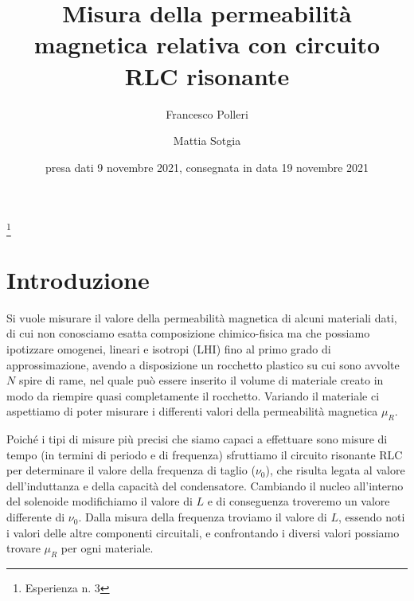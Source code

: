 \documentclass[
    rmp,
    floatfix,
    reprint, 
    superscriptaddress, 
    altaffilletter, 
    amsmath, 
    amssymb, 
    a4paper]{revtex4-2}
\begin{document}
\title{Misura della permeabilità magnetica relativa con circuito RLC risonante
}
\thanks{Esperienza n. 3
}

\author{Francesco Polleri}
\author{Mattia Sotgia}


\date{presa dati
    9 novembre 2021, consegnata in data
    19 novembre 2021
}

\begin{abstract}
    
\end{abstract}
\maketitle
\thispagestyle{fancy}


\section*{Introduzione}\label{sec:introduction}
Si vuole misurare il valore della permeabilità magnetica di alcuni materiali dati, di cui non conosciamo esatta composizione chimico-fisica ma che possiamo ipotizzare omogenei, lineari e isotropi (LHI) fino al primo grado di approssimazione, avendo a disposizione un rocchetto plastico su cui sono avvolte $N$ spire di rame, nel quale può essere inserito il volume di materiale creato in modo da riempire quasi completamente il rocchetto. Variando il materiale ci aspettiamo di poter misurare i differenti valori della permeabilità magnetica $\mu_R$. 

Poiché i tipi di misure più precisi che siamo capaci a effettuare sono misure di tempo (in termini di periodo e di frequenza) sfruttiamo il circuito risonante RLC per determinare il valore della frequenza di taglio ($\nu_0$), che risulta legata al valore dell'induttanza e della capacità del condensatore. Cambiando il nucleo all'interno del solenoide modifichiamo il valore di $L$ e di conseguenza troveremo un valore differente di $\nu_0$. Dalla misura della frequenza troviamo il valore di $L$, essendo noti i valori delle altre componenti circuitali, e confrontando i diversi valori possiamo trovare $\mu_R$ per ogni materiale.
\end{document}
